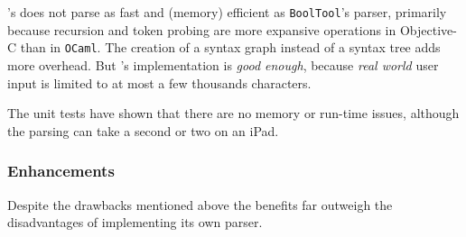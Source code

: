 \Nyaya's \BoolTool does not parse as fast and (memory) efficient as \verb+BoolTool+'s parser,
primarily because recursion and token probing are more expansive operations in Objective-C than in \verb+OCaml+.
The creation of a syntax graph instead of a syntax tree adds more overhead.
But \Nyaya's implementation is {\em good enough}, 
because {\em real world} user input is limited to at most a few thousands characters.

The unit tests have shown that there are no memory or run-time issues, 
although the parsing can take a second or two on an iPad.

\subsubsection{Enhancements}

Despite the drawbacks mentioned above
the benefits far outweigh the disadvantages of implementing its own parser.

